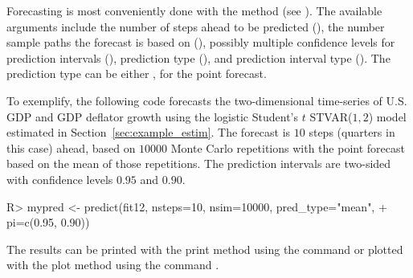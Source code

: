 \documentclass[nojss]{jss}
\begin{document}
Forecasting is most conveniently done with the  method (see ). The available arguments include the number of steps ahead to be predicted (), the number sample paths the forecast is based on (), possibly multiple confidence levels for prediction intervals (), prediction type (), and prediction interval type (). The prediction type can be either ,  for the point forecast.

To exemplify, the following code forecasts the two-dimensional time-series of U.S. GDP and GDP deflator growth using the logistic Student's $t$ STVAR($1, 2$) model  estimated in Section~\ref{sec:example_estim}. The forecast is $10$ steps (quarters in this case) ahead, based on $10000$ Monte Carlo repetitions with the point forecast based on the mean of those repetitions. The prediction intervals are two-sided with confidence levels $0.95$ and $0.90$.
%
\begin{CodeChunk}
\begin{CodeInput}
R> mypred <- predict(fit12, nsteps=10, nsim=10000, pred_type="mean",
+    pi=c(0.95, 0.90))
\end{CodeInput}
\end{CodeChunk}
%
The results can be printed with the print method using the command  or plotted with the plot method using the command .
\end{document}
